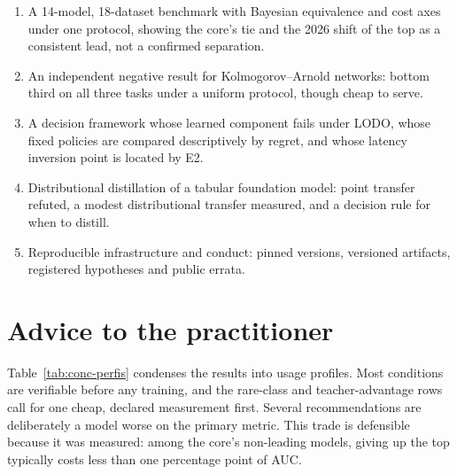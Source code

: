 \begin{enumerate}
  \item A 14-model, 18-dataset benchmark with Bayesian equivalence
    and cost axes under one protocol, showing the core's tie and the
    2026 shift of the top as a consistent lead, not a confirmed
    separation.
  \item An independent negative result for Kolmogorov--Arnold
    networks: bottom third on all three tasks under a uniform
    protocol, though cheap to serve.
  \item A decision framework whose learned component fails under
    LODO, whose fixed policies are compared descriptively by regret,
    and whose latency inversion point is located by E2.
  \item Distributional distillation of a tabular foundation model:
    point transfer refuted, a modest distributional transfer
    measured, and a decision rule for when to distill.
  \item Reproducible infrastructure and conduct: pinned
    versions, versioned artifacts, registered hypotheses and public
    errata.
\end{enumerate}

\section{Advice to the practitioner}
\label{sec:conc-conselhos}

Table~\ref{tab:conc-perfis} condenses the results into usage
profiles. Most conditions are verifiable before any training, and
the rare-class and teacher-advantage rows call for one cheap,
declared measurement first. Several recommendations are deliberately
a model worse on the primary metric. This trade is defensible because it was measured: among the core's non-leading models, giving up the top typically
costs less than one percentage point of AUC.

